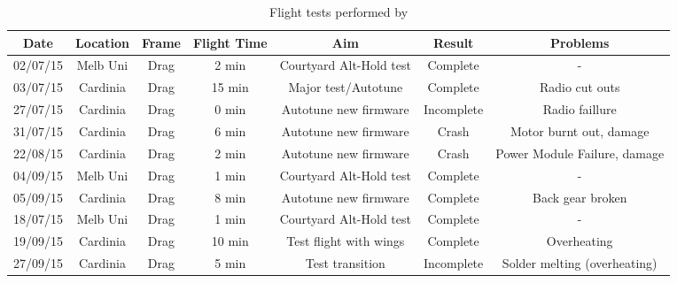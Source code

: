 



\label{sec:diary}
\begin{table}[htbp]
	\centering
	\begin{tabular}{|c|c|c|c|c|c|c|}
		\hline Date & Location & Frame & Flight Time & Aim & Result & Problems \\ 
		\hline 02/07/15 & Melb Uni & Drag & 2 min & Courtyard Alt-Hold test & Complete & - \\ 
		\hline 03/07/15 & Cardinia & Drag & 15 min & Major test/Autotune & Complete & Radio cut outs \\ 
		\hline 27/07/15 & Cardinia  & Drag & 0 min & Autotune new firmware & Incomplete & Radio faillure \\ 
		\hline 31/07/15 & Cardinia  & Drag & 6 min & Autotune new firmware & Crash & Motor burnt out, damage  \\ 
		\hline 22/08/15 & Cardinia  & Drag & 2 min & Autotune new firmware & Crash & Power Module Failure, damage\\
		\hline 04/09/15 & Melb Uni & Drag & 1 min & Courtyard Alt-Hold test & Complete & - \\  
		\hline 05/09/15 & Cardinia  & Drag & 8 min & Autotune new firmware & Complete & Back gear broken\\
		\hline 18/07/15 & Melb Uni & Drag & 1 min & Courtyard Alt-Hold test & Complete & - \\  
		\hline 19/09/15 & Cardinia  & Drag & 10 min & Test flight with wings & Complete & Overheating \\ 
		\hline 27/09/15 & Cardinia  & Drag & 5 min & Test transition & Incomplete & Solder melting (overheating) \\ 
		\hline 
	\end{tabular} 
	\caption{Flight tests performed by \ID}
	\label{tab:tests}
\end{table}


